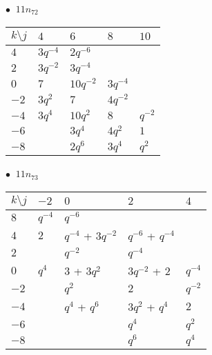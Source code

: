 %
\begin{minipage}{\linewidth}
$\bullet\ $ $11n_{72}$ \vspace{0.5em} \\
\begin{tabular}{l|llll}
$k \setminus j$ & $4$ & $6$ & $8$ & $10$ \\
\hline
$4$ & $3q^{-4}$ & $2q^{-6}$ &  &  \\
$2$ & $3q^{-2}$ & $3q^{-4}$ &  &  \\
$0$ & $7$ & $10q^{-2}$ & $3q^{-4}$ &  \\
$-2$ & $3q^{2}$ & $7$ & $4q^{-2}$ &  \\
$-4$ & $3q^{4}$ & $10q^{2}$ & $8$ & $q^{-2}$ \\
$-6$ &  & $3q^{4}$ & $4q^{2}$ & $1$ \\
$-8$ &  & $2q^{6}$ & $3q^{4}$ & $q^{2}$ \\
\end{tabular}
\vspace{2em}
\end{minipage}
%
\begin{minipage}{\linewidth}
$\bullet\ $ $11n_{73}$ \vspace{0.5em} \\
\begin{tabular}{l|llll}
$k \setminus j$ & $-2$ & $0$ & $2$ & $4$ \\
\hline
$8$ & $q^{-4}$ & $q^{-6}$ &  &  \\
$4$ & $2$ & $q^{-4}$ + $3q^{-2}$ & $q^{-6}$ + $q^{-4}$ &  \\
$2$ &  & $q^{-2}$ & $q^{-4}$ &  \\
$0$ & $q^{4}$ & $3$ + $3q^{2}$ & $3q^{-2}$ + $2$ & $q^{-4}$ \\
$-2$ &  & $q^{2}$ & $2$ & $q^{-2}$ \\
$-4$ &  & $q^{4}$ + $q^{6}$ & $3q^{2}$ + $q^{4}$ & $2$ \\
$-6$ &  &  & $q^{4}$ & $q^{2}$ \\
$-8$ &  &  & $q^{6}$ & $q^{4}$ \\
\end{tabular}
\vspace{2em}
\end{minipage}
%
